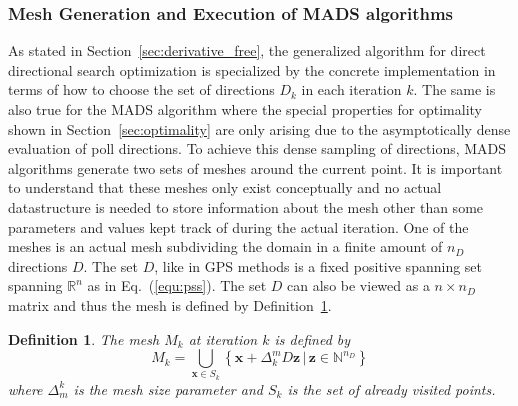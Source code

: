 \documentclass[a4paper,10pt]{article}
\newtheorem{definition}{Definition}
\renewcommand{\vec}[1]{\mathbf{#1}}
\newcommand{\equref}[1]{Eq.~(\ref{#1})}
\newcommand{\secref}[1]{Section~\ref{#1}}
\newcommand{\defref}[1]{Definition~\ref{#1}}
\begin{document}
    \subsubsection{Mesh Generation and Execution of MADS algorithms}

    As stated in \secref{sec:derivative_free}, the generalized algorithm for
    direct directional search optimization is specialized by
    the concrete implementation in terms of how to choose the set of directions
    $D_k$ in each iteration $k$.
    The same is also true for the MADS algorithm where the special properties
    for optimality shown in \secref{sec:optimality} are only arising due
    to the asymptotically dense evaluation of poll directions.
    To achieve this dense sampling of directions, MADS algorithms generate two 
    sets of meshes around the current point.
    It is important to understand that these meshes only exist conceptually and
    no actual datastructure is needed to store information about the mesh
    other than some parameters and values kept track of during the actual
    iteration.
    One of the meshes is an actual mesh subdividing the domain in a finite amount
    of $n_D$ directions $D$.
    The set $D$, like in GPS methods is a fixed positive spanning set spanning
    $\mathbb{R}^n$ as in \equref{equ:pss}.
    The set $D$ can also be viewed as a $n \times n_D$ matrix and thus the
    mesh is defined by \defref{def:mesh}.

    \begin{definition}
        \label{def:mesh}
        The mesh $M_k$ at iteration $k$ is defined by
        \begin{equation}
            M_k = \bigcup_{\vec{x} \in S_k} 
            \left\{ \vec{x} + \Delta^m_k D \vec{z} \, \vert \, \vec{z}
             \in \mathbb{N}^{n_D} \right\}
        \end{equation}        
        where $\Delta_m^k$ is the mesh size parameter and $S_k$ is the 
        set of already visited points.
    \end{definition}
\end{document}
